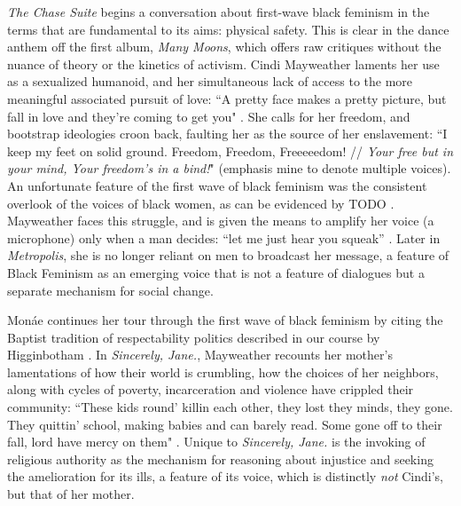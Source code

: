 \documentclass[a4paper, 11pt]{article} %
\begin{document}
\emph{The Chase Suite} begins a conversation about first-wave black feminism in the terms that are fundamental to its aims: physical safety.
This is clear in the dance anthem off the first album, \emph{Many Moons}, which offers raw critiques without the nuance of theory or the kinetics of activism.
Cindi Mayweather laments her use as a sexualized humanoid, and her simultaneous lack of access to the more meaningful associated pursuit of love: ``A pretty face makes a pretty picture, but fall in love and they're coming to get you" \cite{happyhunting}.
She calls for her freedom, and bootstrap ideologies croon back, faulting her as the source of her enslavement: ``I keep my feet on solid ground. Freedom, Freedom, Freeeeedom! // \emph{Your free but in your mind, Your freedom's in a bind!}" \cite{manymoons} (emphasis mine to denote multiple voices).
An unfortunate feature of the first wave of black feminism was the consistent overlook of the voices of black women, as can be evidenced by TODO \cite{alicewalker}.
Mayweather faces this struggle, and is given the means to amplify her voice (a microphone) only when a man decides: ``let me just hear you squeak'' \cite{manymoons}.
Later in \emph{Metropolis}, she is no longer reliant on men to broadcast her message, a feature of Black Feminism as an emerging voice that is not a feature of dialogues but a separate mechanism for social change. 

Mon\'ae continues her tour through the first wave of black feminism by citing the Baptist tradition of respectability politics described in our course by Higginbotham \cite{higginbotham}.
In \emph{Sincerely, Jane.}, Mayweather recounts her mother's lamentations of how their world is crumbling, how the choices of her neighbors, along with cycles of poverty, incarceration and violence have crippled their community:
``These kids round' killin each other, they lost they minds, they gone. They quittin' school, making babies and can barely read. Some gone off to their fall, lord have mercy on them" \cite{sincerelyjane}. 
Unique to \emph{Sincerely, Jane.} is the invoking of religious authority as the mechanism for reasoning about injustice and seeking the amelioration for its ills, a feature of its voice, which is distinctly \emph{not} Cindi's, but that of her mother.
\end{document}
